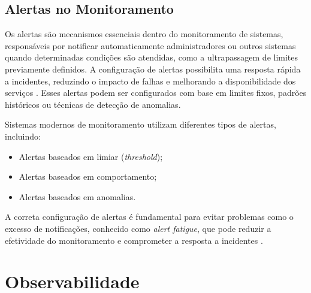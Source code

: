 \documentclass[
    12pt
    ,oneside
    ,a4paper
    ,chapter=TITLE
    ,section=TITLE
    ,sumario=abnt-6027-2012]{abntex2}
\begin{document}
\section{Alertas no Monitoramento}

Os alertas são mecanismos essenciais dentro do monitoramento de sistemas, responsáveis por notificar automaticamente administradores ou outros sistemas quando determinadas condições são atendidas, como a ultrapassagem de limites previamente definidos. A configuração de alertas possibilita uma resposta rápida a incidentes, reduzindo o impacto de falhas e melhorando a disponibilidade dos serviços \cite{googlecloud2023alerting}. Esses alertas podem ser configurados com base em limites fixos, padrões históricos ou técnicas de detecção de anomalias.

Sistemas modernos de monitoramento utilizam diferentes tipos de alertas, incluindo:
\begin{itemize}
    \item Alertas baseados em limiar (\textit{threshold});
    \item Alertas baseados em comportamento;
    \item Alertas baseados em anomalias.
\end{itemize}

A correta configuração de alertas é fundamental para evitar problemas como o excesso de notificações, conhecido como \textit{alert fatigue}, que pode reduzir a efetividade do monitoramento e comprometer a resposta a incidentes \cite{ibm2022itmonitoring}.


\chapter{Observabilidade}
\label{cap:observabilidade}
\end{document}
